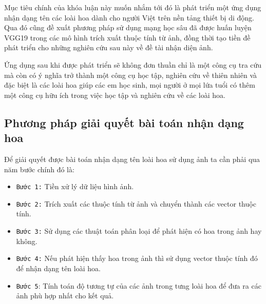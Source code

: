 \documentclass[12pt]{report}
\begin{document}
		Mục tiêu chính của khóa luận này muốn nhắm tới đó là phát triển một ứng dụng nhận dạng tên các loài hoa dành cho người Việt trên nền tảng thiết bị di động. Qua đó cũng đề xuất phương pháp sử dụng mạng học sâu đã được huấn luyện VGG19 \cite{cia_vgg19} trong các mô hình trích xuất thuộc tính từ ảnh, đồng thời tạo tiền đề phát triển cho những nghiên cứu sau này về đề tài nhận diện ảnh.
																																																																						
		Ứng dụng sau khi được phát triển sẽ không đơn thuần chỉ là một công cụ tra cứu mà còn có ý nghĩa trở thành một công cụ học tập, nghiên cứu về thiên nhiên và đặc biệt là các loài hoa giúp các em học sinh, mọi người ở mọi lứa tuổi có thêm một công cụ hữu ích trong việc học tập và nghiên cứu về các loài hoa.
																																																																						
		\subsection{Phương pháp giải quyết bài toán nhận dạng hoa}
																																																																				
		Để giải quyết được bài toán nhận dạng tên loài hoa sử dụng ảnh ta cần phải qua năm bước chính đó là:
																																																																				
		\begin{itemize}
			\item \texttt{Bước 1:} Tiền xử lý dữ liệu hình ảnh.
			\item \texttt{Bước 2:} Trích xuất các thuộc tính từ ảnh và chuyển thành các vector thuộc tính.
			\item \texttt{Bước 3:} Sử dụng các thuật toán phân loại để phát hiện có hoa trong ảnh hay không.
			\item \texttt{Bước 4:}	Nếu phát hiện thấy hoa trong ảnh thì sử dụng vector thuộc tính đó để nhận dạng tên loài hoa.
			\item \texttt{Bước 5}: Tính toán độ tương tự của các ảnh trong tưng loài hoa để đưa ra các ảnh phù hợp nhất cho kết quả.
		\end{itemize}
																																																																		
																																																																		
\end{document}
